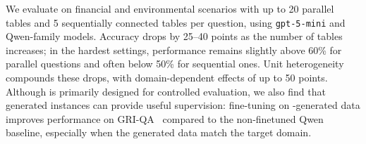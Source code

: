 We evaluate \name on financial and environmental scenarios with up to 20 parallel tables and 5 sequentially connected tables per question, using \texttt{gpt-5-mini} and Qwen-family models. Accuracy drops by 25--40 points as the number of tables increases; in the hardest settings, performance remains slightly above 60\% for parallel questions and often below 50\% for sequential ones. Unit heterogeneity compounds these drops, with domain-dependent effects of up to 50 points. 
Although \name is primarily designed for controlled evaluation, we also find that generated instances can provide useful supervision: fine-tuning on \name-generated data improves performance on GRI-QA~\cite{1.16} compared to the non-finetuned Qwen baseline, especially when the generated data match the target domain.





